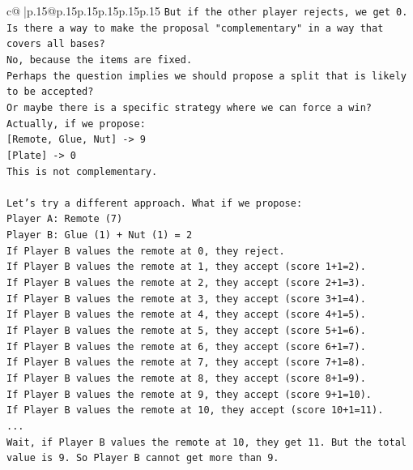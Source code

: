 \documentclass{article}
\begin{document}
{\begin{supertabular}{c@{$\;$}|p{.15\linewidth}@{}p{.15\linewidth}p{.15\linewidth}p{.15\linewidth}p{.15\linewidth}p{.15\linewidth}}
{{{\texttt{But if the other player rejects, we get 0.} \\
\texttt{Is there a way to make the proposal "complementary" in a way that covers all bases?} \\
\texttt{No, because the items are fixed.} \\
\texttt{Perhaps the question implies we should propose a split that is likely to be accepted?} \\
\texttt{Or maybe there is a specific strategy where we can force a win?} \\
\texttt{Actually, if we propose:} \\
\texttt{{[}Remote, Glue, Nut{]} {-}> 9} \\
\texttt{{[}Plate{]} {-}> 0} \\
\texttt{This is not complementary.} \\
\\ 
\texttt{Let's try a different approach. What if we propose:} \\
\texttt{Player A: Remote (7)} \\
\texttt{Player B: Glue (1) + Nut (1) = 2} \\
\texttt{If Player B values the remote at 0, they reject.} \\
\texttt{If Player B values the remote at 1, they accept (score 1+1=2).} \\
\texttt{If Player B values the remote at 2, they accept (score 2+1=3).} \\
\texttt{If Player B values the remote at 3, they accept (score 3+1=4).} \\
\texttt{If Player B values the remote at 4, they accept (score 4+1=5).} \\
\texttt{If Player B values the remote at 5, they accept (score 5+1=6).} \\
\texttt{If Player B values the remote at 6, they accept (score 6+1=7).} \\
\texttt{If Player B values the remote at 7, they accept (score 7+1=8).} \\
\texttt{If Player B values the remote at 8, they accept (score 8+1=9).} \\
\texttt{If Player B values the remote at 9, they accept (score 9+1=10).} \\
\texttt{If Player B values the remote at 10, they accept (score 10+1=11).} \\
\texttt{...} \\
\texttt{Wait, if Player B values the remote at 10, they get 11. But the total value is 9. So Player B cannot get more than 9.} \\
}}}
\end{supertabular}}
\end{document}
